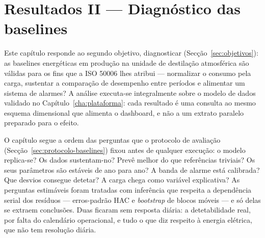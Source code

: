 
\chapter{Resultados II --- Diagnóstico das baselines}
\label{cha:diagnostico}

Este capítulo responde ao segundo objetivo, diagnosticar
(Secção~\ref{sec:objetivos}): as baselines
energéticas em produção na unidade de destilação atmosférica são válidas para
os fins que a ISO 50006 lhes atribui --- normalizar o consumo pela carga,
sustentar a comparação de desempenho entre períodos e alimentar um sistema de
alarmes? A análise executa-se integralmente sobre o modelo de dados
validado no Capítulo~\ref{cha:plataforma}: cada resultado é uma consulta ao
mesmo esquema dimensional que alimenta o dashboard, e não a um extrato
paralelo preparado para o efeito.

O capítulo segue a ordem das perguntas que o protocolo de avaliação
(Secção~\ref{sec:protocolo-baselines}) fixou antes de qualquer execução:
o modelo replica-se? Os dados sustentam-no? Prevê melhor do que referências
triviais? Os seus parâmetros são estáveis de ano para ano? A banda de alarme
está calibrada? Que desvios consegue detetar? A carga chega como variável
explicativa? As perguntas estimáveis foram tratadas com inferência que
respeita a dependência serial dos resíduos --- erros-padrão HAC e
\emph{bootstrap} de blocos móveis --- e só delas se extraem conclusões. Duas
ficaram sem resposta diária: a detetabilidade real, por falta do calendário
operacional, e tudo o que diz respeito à energia elétrica, que não tem
resolução diária.

